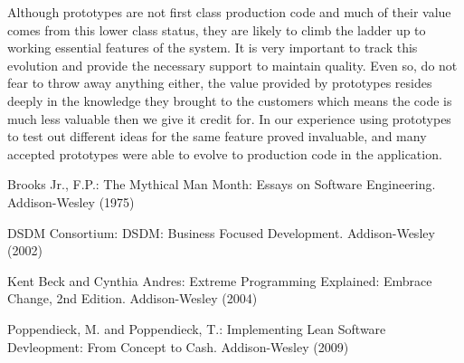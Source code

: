 \documentclass[lnbip]{svmultln}
\begin{document}
Although prototypes are not first class production code and much of
their value comes from this lower class status, they are likely to
climb the ladder up to working essential features of the system. It
is very important to track this evolution and provide the necessary support
to maintain quality. Even so, do not fear to throw away anything either,
the value provided by prototypes resides deeply in the knowledge they
brought to the customers which means the code is much less valuable
then we give it credit for. In our experience using prototypes to test out different ideas for the same feature proved invaluable, and many accepted prototypes were able to evolve to production code in the application.

%
%
\begin{thebibliography}{5}

 Brooks Jr., F.P.: The Mythical Man Month: Essays
  on Software Engineering. Addison-Wesley (1975)

 DSDM Consortium: DSDM: Business Focused
  Development. Addison-Wesley (2002)
  
 Kent Beck and Cynthia Andres: Extreme Programming Explained: Embrace Change, 2nd Edition. Addison-Wesley (2004)  




 Poppendieck, M. and Poppendieck, T.:
  Implementing Lean Software Devleopment: From Concept to
  Cash. Addison-Wesley (2009)

\end{thebibliography}
%
\end{document}
